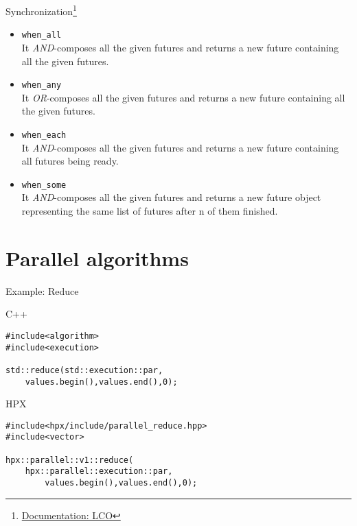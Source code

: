 \documentclass[\classoption]{beamer}
\begin{document}
\begin{frame}[fragile]{Synchronization\footnote{\tiny\href{https://stellar-group.github.io/hpx/docs/sphinx/latest/html/terminology.html\#term-lco}{Documentation: LCO}}}

\begin{itemize}
\item \lstinline|when_all| \\
It \textit{AND}-composes all the given futures and returns a new future containing all the given futures.
\item \lstinline|when_any| \\
It \textit{OR}-composes all the given futures and returns a new future containing all the given futures.
\item \lstinline|when_each| \\
It \textit{AND}-composes all the given futures and returns a new future containing all futures being ready.
\item \lstinline|when_some| \\
It \textit{AND}-composes all the given futures and returns a new future object representing the same list of futures after n of them finished.

\end{itemize}

\end{frame}


\section{Parallel algorithms}


\begin{frame}[fragile]{Example: Reduce}

\begin{block}{C++}
\begin{lstlisting}
#include<algorithm>
#include<execution>

std::reduce(std::execution::par,
	values.begin(),values.end(),0);
\end{lstlisting}
\end{block}

\begin{block}{HPX}
\begin{lstlisting}
#include<hpx/include/parallel_reduce.hpp>
#include<vector>

hpx::parallel::v1::reduce(
	hpx::parallel::execution::par,
		values.begin(),values.end(),0);

\end{lstlisting}
\end{block}

\end{frame}
\end{document}
